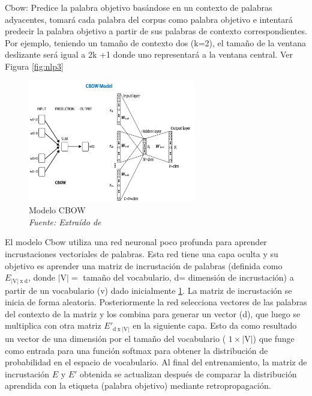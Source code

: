 \begin{itemize}
\begin{itemize}
Cbow: Predice la palabra objetivo basándose en un contexto de palabras adyacentes, tomará cada palabra del corpus como palabra objetivo e intentará predecir la palabra objetivo a partir de sus palabras de contexto correspondientes. Por ejemplo, teniendo un tamaño de contexto dos (k=2), el  tamaño de la ventana deslizante será igual a 2k +1 donde uno representará  a la ventana central. Ver Figura \ref{fig:nlp3}



\begin{figure}[h!]
	\includegraphics[width=0.65\textwidth]{capitulo3/figuras/nlp4.png}
	\caption{Modelo CBOW
		\\\textit{Fuente: Extraído de} \protect\cite[p. 100]{vajjala2020practical}}
	\label{fig:nlp4}
\end{figure}

El modelo Cbow utiliza una red neuronal poco profunda para aprender incrustaciones vectoriales de palabras. Esta red tiene una capa oculta y su objetivo es aprender una matriz de incrustación de palabras (definida como $E_{ \left | \textrm{V}  \right |\: \textrm{x} \: \textrm{d}}$,  donde $\left | \textrm{V}  \right | = $ tamaño del vocabulario, d= dimensión de incrustación)  a partir de un vocabulario (v)  dado inicialmente  \ref{fig:nlp4}. La matriz de incrustación se inicia de forma aleatoria. Posteriormente  la red selecciona vectores de las palabras del contexto de la matriz y los combina para generar un vector (d), que luego se multiplica con otra matriz ${E}'_{ \textrm{d} \: \textrm{x}  \:\left | \textrm{V}  \right | }$ en la siguiente capa. Esto da como resultado un vector de una dimensión por el tamaño del vocabulario ( $1 \times \left | \textrm{V}  \right |$) que funge como entrada para una función softmax para obtener la distribución de probabilidad en el espacio de vocabulario. Al final del entrenamiento, la matriz de incrustación $E$ y $E'$ obtenida se actualizan después de comparar la distribución aprendida con la etiqueta (palabra objetivo) mediante retropropagación.


\end{itemize}
\end{itemize}
